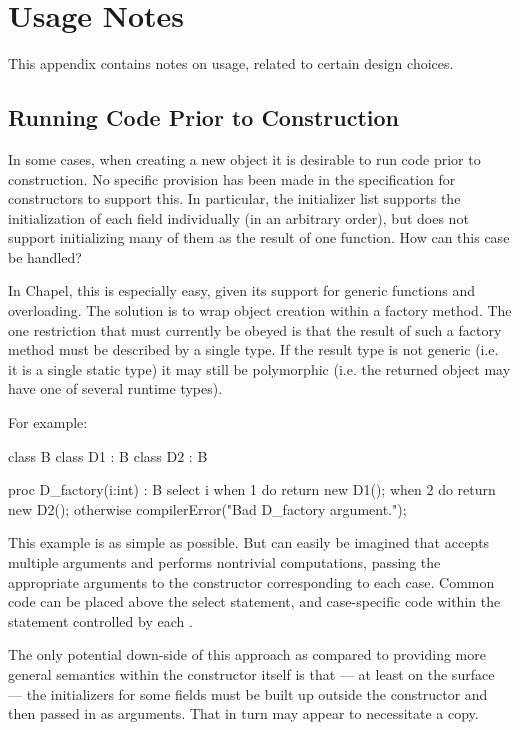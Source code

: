 \section{Usage Notes}

This appendix contains notes on usage, related to certain design choices.

\subsection{Running Code Prior to Construction}

In some cases, when creating a new object it is desirable to run code prior to
construction.  No specific provision has been made in the specification for constructors
to support this.  In particular, the initializer list supports the initialization of each
field individually (in an arbitrary order), but does not support initializing many of them
as the result of one function.  How can this case be handled?

In Chapel, this is especially easy, given its support for generic functions and
overloading.  The solution is to wrap object creation within a factory method.  The one
restriction that must currently be obeyed is that the result of such a factory method must
be described by a single type.  If the result type is not generic (i.e. it is a single
static type) it may still be polymorphic (i.e. the returned object may have one of several
runtime types).  

For example:
\begin{chapel}
class B { }
class D1 : B { }
class D2 : B { }

proc D_factory(i:int) : B {
  select i {
    when 1 do return new D1();
    when 2 do return new D2();
    otherwise compilerError("Bad D_factory argument.");
  }
}
\end{chapel}
\noindent
This example is as simple as possible.  But can easily be imagined that 
accepts multiple arguments and performs nontrivial computations, passing the appropriate
arguments to the constructor corresponding to each case.  Common code can be placed above
the select statement, and case-specific code within the statement controlled by each
.

The only potential down-side of this approach as compared to providing more general
semantics within the constructor itself is that --- at least on the surface --- the
initializers for some fields must be built up outside the constructor and then passed in
as arguments.  That in turn may appear to necessitate a copy.  

